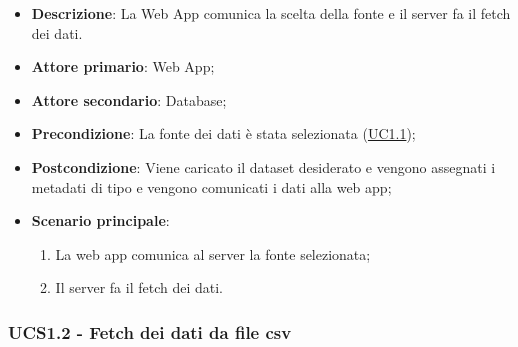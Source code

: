 \begin{itemize}

	\item \textbf{Descrizione}: La Web App comunica la scelta della fonte e il server fa il fetch dei dati.
	
    \item \textbf{Attore primario}: Web App;
	\item \textbf{Attore secondario}: Database;
        
    \item \textbf{Precondizione}:   La fonte dei dati è stata selezionata (\hyperref[ssub:uc1.1]{UC1.1});

    \item \textbf{Postcondizione}:  Viene caricato il dataset desiderato e vengono assegnati i metadati di tipo e vengono comunicati i dati alla web app;

	\item \textbf{Scenario principale}:
		\begin{enumerate}
			\item La web app comunica al server la fonte selezionata;
            \item Il server fa il fetch dei dati.
        \end{enumerate}
	
\end{itemize}


\subsubsection{UCS1.2 - Fetch dei dati da file csv}
\label{ssub:ucs1.2}

